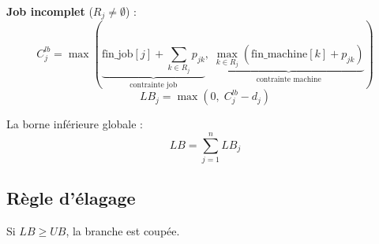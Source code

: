 \documentclass[a4paper,12pt]{article}
\begin{document}
\textbf{Job incomplet} ($R_j \neq \emptyset$) :
\begin{equation}
    C_j^{lb} = \max\left(
        \underbrace{\text{fin\_job}[j] + \sum_{k \in R_j} p_{jk}}_{\text{contrainte job}},\;
        \underbrace{\max_{k \in R_j} \left( \text{fin\_machine}[k] + p_{jk} \right)}_{\text{contrainte machine}}
    \right)
\end{equation}
\begin{equation}
    LB_j = \max(0,\; C_j^{lb} - d_j)
\end{equation}

La borne inférieure globale :
\begin{equation}
    LB = \sum_{j=1}^{n} LB_j
\end{equation}

\subsection*{Règle d'élagage}

Si $LB \geq UB$, la branche est coupée.
\end{document}
